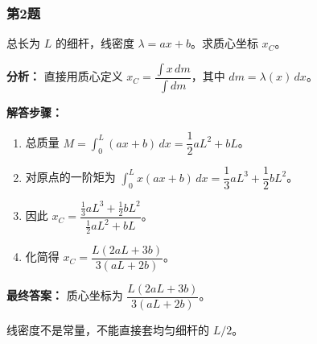 \documentclass[12pt,a4paper]{ctexart}
\begin{document}
\subsubsection*{第2题}
\begin{tcolorbox}[colback=gray!2!white,colframe=black!60,title={题目}]
总长为 \(L\) 的细杆，线密度 \(\lambda=ax+b\)。求质心坐标 \(x_C\)。\par
\end{tcolorbox}
\begin{tcolorbox}[colback=blue!2!white,colframe=blue!55!black,title={完整答案}]
\textbf{分析：}
直接用质心定义 \(x_C=\dfrac{\int x\,dm}{\int dm}\)，其中 \(dm=\lambda(x)\,dx\)。\par
\textbf{解答步骤：}
\begin{enumerate}
\item 总质量 \(M=\int_0^L (ax+b)\,dx=\dfrac12 aL^2+bL\)。
\item 对原点的一阶矩为 \(\int_0^L x(ax+b)\,dx=\dfrac13 aL^3+\dfrac12 bL^2\)。
\item 因此 \(x_C=\dfrac{\frac13 aL^3+\frac12 bL^2}{\frac12 aL^2+bL}\)。
\item 化简得 \(x_C=\dfrac{L(2aL+3b)}{3(aL+2b)}\)。
\end{enumerate}
\textbf{最终答案：}
质心坐标为 \(\dfrac{L(2aL+3b)}{3(aL+2b)}\)。\par
\end{tcolorbox}
\begin{tcolorbox}[colback=red!2!white,colframe=red!55!black,title={易错点}]
线密度不是常量，不能直接套均匀细杆的 \(L/2\)。\par
\end{tcolorbox}
\end{document}
